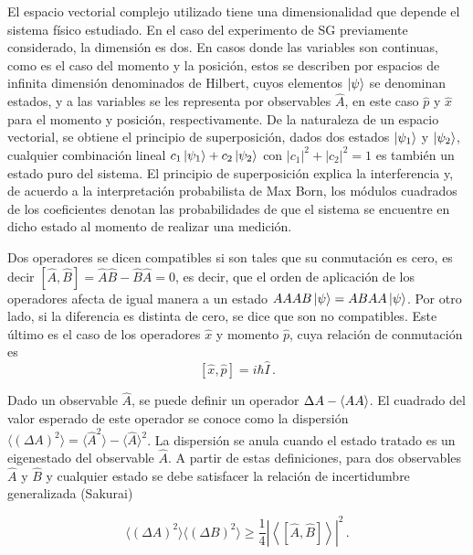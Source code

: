 
El espacio vectorial complejo utilizado tiene una dimensionalidad que depende el sistema físico estudiado. En el caso del experimento de SG previamente considerado, la dimensión es dos. En casos donde las variables son continuas, como es el caso del momento y la posición, estos se describen por espacios de infinita dimensión denominados de Hilbert, cuyos elementos $\ket{\psi}$ se denominan estados, y a las variables se les representa por observables $\hat{A}$, en este caso $\hat{p}$ y $\hat{x}$ para el momento y posición, respectivamente. De la naturaleza de un espacio vectorial, se obtiene el principio de superposición, dados dos estados $\ket{\psi_1}$ y $\ket{\psi_2}$, cualquier combinación lineal $c_1 \ket{\psi_1} + c_2 \ket{\psi_2}$ con $|c_1|^2 + |c_2|^2 = 1$ es también un estado puro del sistema. El principio de superposición explica la interferencia y, de acuerdo a la interpretación probabilista de Max Born, los módulos cuadrados de los coeficientes denotan las probabilidades de que el sistema se encuentre en dicho estado al momento de realizar una medición.

Dos operadores se dicen compatibles si son tales que su conmutación es cero, es decir $[\hat{A}, \hat{B}] = \hat{A}\hat{B} - \hat{B}\hat{A} = 0$, es decir, que el orden de aplicación de los operadores afecta de igual manera a un estado $\hat{A} \hat{B} \ket{\psi} = \hat{B} \hat{A} \ket{\psi}$. Por otro lado, si la diferencia es distinta de cero, se dice que son no compatibles. Este último es el caso de los operadores $\hat{x}$ y momento $\hat{p}$, cuya relación de conmutación es
\begin{equation}
  \label{1.3}
  [\hat{x}, \hat{p}] = i\hbar \hat{I}\,.
\end{equation}

Dado un observable $\hat{A}$, se puede definir un operador $\Delta A \def \hat{A} - \langle \hat{A} \rangle$. El cuadrado del valor esperado de este operador se conoce como la dispersión $\langle (\Delta A)^2 \rangle = \langle \hat{A}^2\rangle  - \langle\hat{A}\rangle^2$. La dispersión se anula cuando el estado tratado es un eigenestado del observable $\hat{A}$. A partir de estas definiciones, para dos observables $\hat{A}$ y $\hat{B}$ y cualquier estado se debe satisfacer la relación de incertidumbre generalizada \cite{Sakurai} (Sakurai)

\begin{equation}
  \label{1.4}
  \langle (\Delta A)^2 \rangle \langle (\Delta B)^2 \rangle \geq \frac{1}{4} \left| \left\langle \left[ \hat{A}, \hat{B} \right] \right\rangle  \right|^2 \,.
\end{equation}